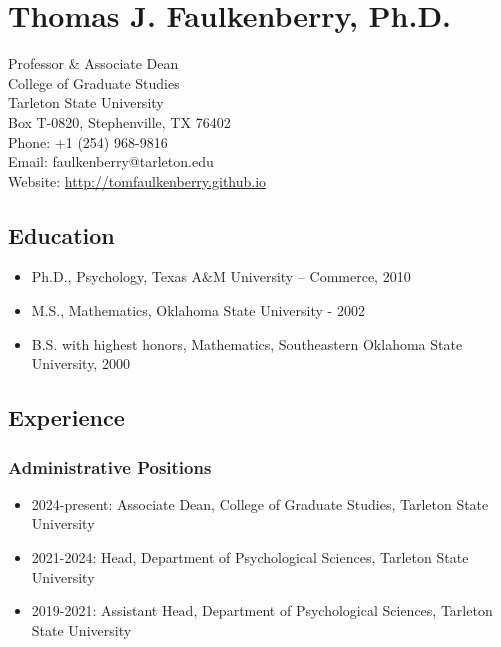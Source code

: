 \documentclass[article,10pt]{article}
\date{\today}
\title{}
\begin{document}
\section*{Thomas J. Faulkenberry, Ph.D.}
\label{sec:org6df06d6}

Professor \& Associate Dean\\[0pt]
College of Graduate Studies\\[0pt]
Tarleton State University\\[0pt]
Box T-0820, Stephenville, TX 76402\\[0pt]
Phone: +1 (254) 968-9816\\[0pt]
Email: faulkenberry@tarleton.edu\\[0pt]
Website: \url{http://tomfaulkenberry.github.io}

\subsection*{Education}
\label{sec:org24ff1e8}
\begin{itemize}
\item Ph.D., Psychology, Texas A\&M University – Commerce, 2010
\item M.S., Mathematics, Oklahoma State University - 2002
\item B.S. with highest honors, Mathematics, Southeastern Oklahoma State University, 2000
\end{itemize}

\subsection*{Experience}
\label{sec:org4801d37}
\subsubsection*{Administrative Positions}
\label{sec:org1ae87d1}
\begin{itemize}
\item 2024-present: Associate Dean, College of Graduate Studies, Tarleton State University
\item 2021-2024: Head, Department of Psychological Sciences, Tarleton State University
\item 2019-2021: Assistant Head, Department of Psychological Sciences, Tarleton State University
\end{itemize}
\end{document}
